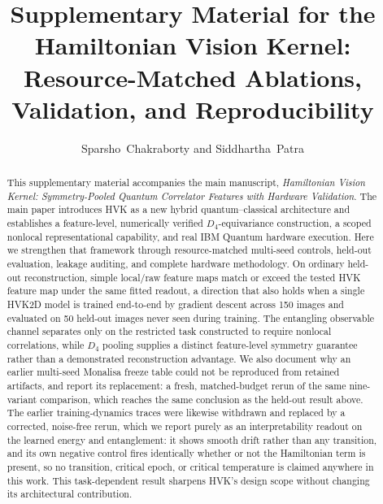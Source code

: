 \documentclass[11pt]{article}
\title{Supplementary Material for the Hamiltonian Vision Kernel:\\ Resource-Matched Ablations, Validation, and Reproducibility}
\author{Sparsho~Chakraborty and Siddhartha~Patra}
\date{}
\begin{document}
\maketitle

\begin{abstract}
This supplementary material accompanies the main manuscript, \textit{Hamiltonian Vision Kernel: Symmetry-Pooled Quantum Correlator Features with Hardware Validation}. The main paper introduces HVK as a new hybrid quantum--classical architecture and establishes a feature-level, numerically verified $D_4$-equivariance construction, a scoped nonlocal representational capability, and real IBM Quantum hardware execution. Here we strengthen that framework through resource-matched multi-seed controls, held-out evaluation, leakage auditing, and complete hardware methodology. On ordinary held-out reconstruction, simple local/raw feature maps match or exceed the tested HVK feature map under the same fitted readout, a direction that also holds when a single HVK2D model is trained end-to-end by gradient descent across 150 images and evaluated on 50 held-out images never seen during training. The entangling observable channel separates only on the restricted task constructed to require nonlocal correlations, while $D_4$ pooling supplies a distinct feature-level symmetry guarantee rather than a demonstrated reconstruction advantage. We also document why an earlier multi-seed Monalisa freeze table could not be reproduced from retained artifacts, and report its replacement: a fresh, matched-budget rerun of the same nine-variant comparison, which reaches the same conclusion as the held-out result above. The earlier training-dynamics traces were likewise withdrawn and replaced by a corrected, noise-free rerun, which we report purely as an interpretability readout on the learned energy and entanglement: it shows smooth drift rather than any transition, and its own negative control fires identically whether or not the Hamiltonian term is present, so no transition, critical epoch, or critical temperature is claimed anywhere in this work. This task-dependent result sharpens HVK's design scope without changing its architectural contribution.
\end{abstract}

\tableofcontents
\end{document}
